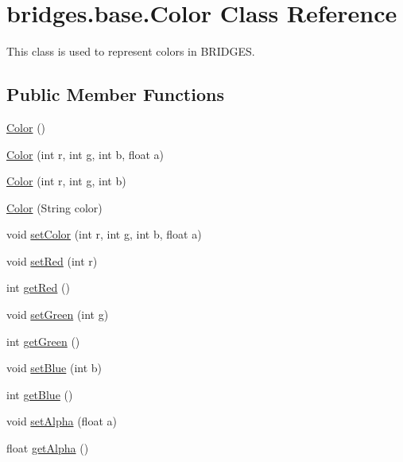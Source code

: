 \hypertarget{classbridges_1_1base_1_1_color}{}\section{bridges.\+base.\+Color Class Reference}
\label{classbridges_1_1base_1_1_color}


This class is used to represent colors in B\+R\+I\+D\+G\+E\+S.  


\subsection*{Public Member Functions}
\begin{DoxyCompactItemize}
\item 
\hyperlink{classbridges_1_1base_1_1_color_ab6d71ac2ee1430fb2db2fbe34e692de8}{Color} ()
\item 
\hyperlink{classbridges_1_1base_1_1_color_a15f56590ca3c9cc161c7bfa47060ad21}{Color} (int r, int g, int b, float a)
\item 
\hyperlink{classbridges_1_1base_1_1_color_a5fab564fa4eec8bece64f847ebd42948}{Color} (int r, int g, int b)
\item 
\hyperlink{classbridges_1_1base_1_1_color_a5cb17fdf8eddf44fc0763ceb7d4d833b}{Color} (String color)
\item 
void \hyperlink{classbridges_1_1base_1_1_color_a5559b1c7eb4c3901526b1012029b528f}{set\+Color} (int r, int g, int b, float a)
\item 
void \hyperlink{classbridges_1_1base_1_1_color_a1d78967703924b709e76def5b2b3ee9a}{set\+Red} (int r)
\item 
int \hyperlink{classbridges_1_1base_1_1_color_af1a30dc925b35d6bfe609f8838651025}{get\+Red} ()
\item 
void \hyperlink{classbridges_1_1base_1_1_color_a415a28133ade4e216c02ecdfc8a32a1d}{set\+Green} (int g)
\item 
int \hyperlink{classbridges_1_1base_1_1_color_a8f3fdd23cf785704faa2e3701e25978f}{get\+Green} ()
\item 
void \hyperlink{classbridges_1_1base_1_1_color_a0e04156b1573cf8002c4d9cb69825657}{set\+Blue} (int b)
\item 
int \hyperlink{classbridges_1_1base_1_1_color_ad4b82e1eb9ff59857d2868edd8d4ce65}{get\+Blue} ()
\item 
void \hyperlink{classbridges_1_1base_1_1_color_afab07ce64efa1fa5797795670b0effb6}{set\+Alpha} (float a)
\item 
float \hyperlink{classbridges_1_1base_1_1_color_a7c4247e31ecd8fcc61ef208d5deefe68}{get\+Alpha} ()

\end{DoxyCompactItemize}
